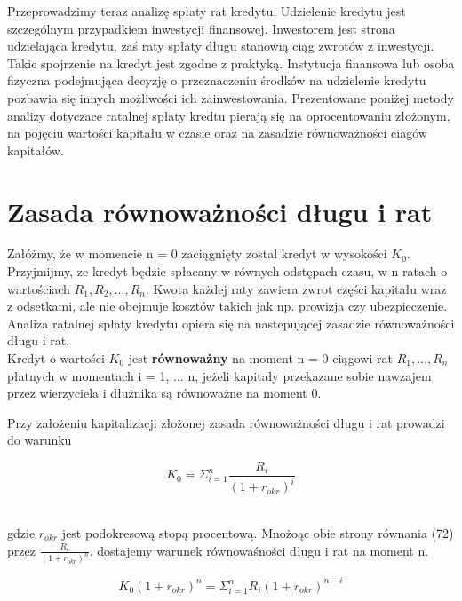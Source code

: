 \documentclass{article}
\begin{document}
Przeprowadzimy teraz analizę spłaty rat kredytu. Udzielenie kredytu jest szczególnym przypadkiem inwestycji finansowej. Inwestorem jest strona udzielająca kredytu, zaś raty spłaty długu stanowią ciąg zwrotów z inwestycji. Takie spojrzenie na kredyt jest zgodne z praktyką. Instytucja finansowa lub osoba fizyczna podejmująca decyzję o przeznaczeniu środków na udzielenie kredytu pozbawia się innych możliwości ich zainwestowania. Prezentowane poniżej metody analizy dotyczace ratalnej spłaty kredtu pierają się na oprocentowaniu złożonym, na pojęciu wartości kapitału w czasie oraz na zasadzie równoważności ciagów kapitałów. 

\section{Zasada równoważności długu i rat}

Załóżmy, że w momencie n = 0 zaciągnięty zostal kredyt w wysokości $ K_0 $. Przyjmijmy, ze kredyt będzie spłacany w równych odstępach czasu, w n ratach o wartościach $ R_1, R_2, ..., R_n $. Kwota każdej raty zawiera zwrot części kapitału wraz z odsetkami, ale nie obejmuje kosztów takich jak np. prowizja czy ubezpieczenie. Analiza ratalnej spłaty kredytu opiera się na nastepującej zasadzie równoważności długu i rat. \\

Kredyt o wartości $ K_0 $ jest \textbf{równoważny} na moment n = 0 ciągowi rat $ R_1, ..., R_n $ płatnych w momentach i = 1, ... n, jeżeli kapitały przekazane sobie nawzajem przez wierzyciela i dłużnika są równoważne na moment 0.

Przy założeniu kapitalizacji złożonej zasada równoważności długu i rat prowadzi do warunku

\begin{center}
	\begin{equation}
		K_0 = \Sigma ^n_{i=1} \frac{R_i}{(1 + r_{okr})^i}
	\end{equation}
\end{center}\\

gdzie $ r_{okr} $ jest podokresową stopą procentową. Mnożoąc obie strony równania (72) przez $ \frac{R_i}{(1 + r_{okr})^n} $. dostajemy warunek równowaśności długu i rat na moment n.

\begin{center}
	\begin{equation}
		K_0(1 + r_{okr})^n = \Sigma ^n_{i=1}R_i(1 + r_{okr})^{n-i}
	\end{equation}
\end{center}\\
\end{document}
